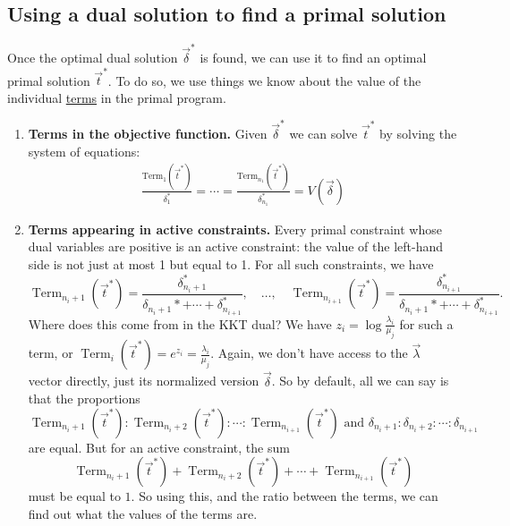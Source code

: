 \documentclass[11pt,a4paper]{article}
\begin{document}
\subsection{Using a dual solution to find a primal solution}
Once the optimal dual solution $\vec{\delta}^*$ is found, we can use it to find an optimal primal solution $\vec{t}^*$. To do so, we use things we know about the value of the individual \underline{terms} in the primal program.
\begin{enumerate}[(1)]
    \item \textbf{Terms in the objective function.} Given $\vec{\delta}^*$ we can solve $\vec{t}^*$ by solving the system of equations:
    \begin{equation}
        \begin{aligned}
            \frac{\text{Term}_1(\vec{t}^*)}{\delta_1^*}=\cdots=\frac{\text{Term}_{n_1}(\vec{t}^*)}{\delta_{n_1}^*}=V(\vec{\delta})
        \end{aligned}
        \nonumber
    \end{equation}
    \item \textbf{Terms appearing in active constraints.} Every primal constraint whose dual variables are positive is an active constraint: the value of the left-hand side is not just at most 1 but equal to 1. For all such constraints, we have
    $$
    \operatorname{Term}_{n_i+1}\left(\vec{t}^*\right)=\frac{\delta_{n_i+1}^*}{\delta_{n_i+1} *+\cdots+\delta_{n_{i+1}}^*}, \quad \ldots, \quad \operatorname{Term}_{n_{i+1}}\left(\vec{t}^*\right)=\frac{\delta_{n_{i+1}}^*}{\delta_{n_i+1} *+\cdots+\delta_{n_{i+1}}^*} .
    $$
    Where does this come from in the KKT dual?
    We have $z_i=\log \frac{\lambda_i}{\mu_j}$ for such a term, or $\operatorname{Term}_i\left(\vec{t}^*\right)=e^{z_i}=\frac{\lambda_i}{\mu_j}$. Again, we don't have access to the $\vec{\lambda}$ vector directly, just its normalized version $\vec{\delta}$. So by default, all we can say is that the proportions
    $$\operatorname{Term}_{n_i+1}\left(\vec{t}^*\right): \operatorname{Term}_{n_i+2}\left(\vec{t}^*\right): \cdots: \operatorname{Term}_{n_{i+1}}\left(\vec{t}^*\right) \text{ and } \delta_{n_i+1}: \delta_{n_i+2}: \cdots: \delta_{n_{i+1}}$$
    are equal.
    But for an active constraint, the sum
    $$
    \operatorname{Term}_{n_i+1}\left(\vec{t}^*\right)+\operatorname{Term}_{n_i+2}\left(\vec{t}^*\right)+\cdots+\operatorname{Term}_{n_{i+1}}\left(\vec{t}^*\right)
    $$
    must be equal to $1$. So using this, and the ratio between the terms, we can find out what the values of the terms are.
\end{enumerate}
\end{document}
